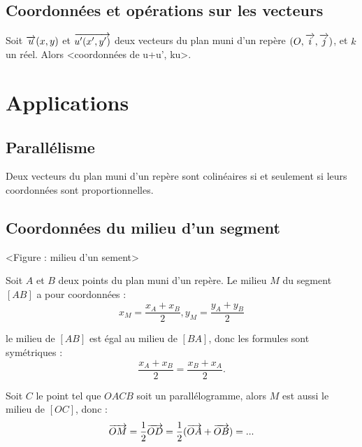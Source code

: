 \documentclass[a4paper,11pt,DIV18,BCOR0mm]{scrartcl}
\begin{document}
\begin{demonstration}
 
\end{demonstration}


\subsection{Coordonnées et opérations sur les vecteurs}
\begin{theoreme}
 Soit $\overrightarrow{u}(x,y)$ et $\overrightarrow{u'(x',y')}$ deux vecteurs du plan muni d'un repère $(O,\overrightarrow{i},\overrightarrow{j})$,
et $k$ un réel. Alors <coordonnées de u+u', ku>.
\end{theoreme}


\section{Applications}

\subsection{Parallélisme}
\begin{theoreme}
 Deux vecteurs du plan muni d'un repère sont colinéaires si et seulement si leurs coordonnées sont proportionnelles.
\end{theoreme}



\subsection{Coordonnées du milieu d'un segment}
\begin{center}
 <Figure : milieu d'un sement>
\end{center}
\begin{theoreme}
 Soit $A$ et $B$ deux points du plan muni d'un repère. Le milieu $M$ du segment $[AB]$ a pour coordonnées :
\[
 x_M=\dfrac{x_A+x_B}{2},y_M=\dfrac{y_A+y_B}{2}
\]
\end{theoreme}
\begin{remarque}le milieu de $[AB]$ est égal au milieu de $[BA]$, donc les formules sont symétriques :
\[
  \dfrac{x_A+x_B}{2}=\dfrac{x_B+x_A}{2}.
\]
\end{remarque}
\begin{demonstration}
Soit $C$ le point tel que $OACB$ soit un parallélogramme, alors $M$ est aussi le milieu de $[OC]$,
donc :
\[
 \overrightarrow{OM}=\frac12\overrightarrow{OD}=\frac12(\overrightarrow{OA}+\overrightarrow{OB})=...
\]
\end{demonstration}
\end{document}
